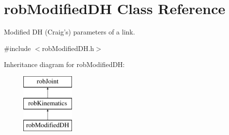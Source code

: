 \hypertarget{classrob_modified_d_h}{\section{rob\-Modified\-D\-H Class Reference}
\label{classrob_modified_d_h}
}


Modified D\-H (Craig's) parameters of a link.  




{\ttfamily \#include $<$rob\-Modified\-D\-H.\-h$>$}

Inheritance diagram for rob\-Modified\-D\-H\-:\begin{figure}[H]
\begin{center}
\leavevmode
\includegraphics[height=3.000000cm]{dc/d40/classrob_modified_d_h}
\end{center}
\end{figure}
